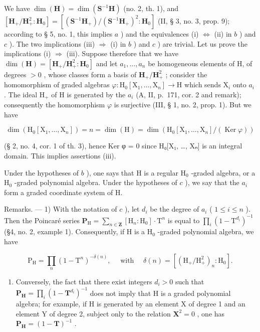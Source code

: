 We have \(\dim(\mathbf{H})=\dim(\mathbf{S}^{-1}\mathbf{H})\) (no. 2, th. 1), and \([\mathbf{H}_{+}/\mathbf{H}_{+}^{2}:\mathbf{H}_{0}]=[(\mathbf{S}^{-1}\mathbf{H}_{+})/(\mathbf{S}^{-1}\mathbf{H}_{+})^{2}:\mathbf{H}_{0}]\) (II, § 3, no. 3, prop. 9); according to § 5, no. 1, this implies \(a\) ) and the equivalences (i) \(\Leftrightarrow\) (ii) in \(b\) ) and \(c\) ). The two implications (iii) \(\Rightarrow\) (i) in \(b\) ) and \(c\) ) are trivial. Let us prove the implications (i) \(\Rightarrow\) (iii). Suppose therefore that we have \(\dim(\mathbf{H})=[\mathbf{H}_{+}/\mathbf{H}_{+}^{2}:\mathbf{H}_{0}]\) and let \(a_{1},\ldots,a_{n}\) be homogeneous elements of H, of degrees \(>0\) , whose classes form a basis of \(\mathbf{H}_{+}/\mathbf{H}_{+}^{2}\) ; consider the homomorphism of graded algebras \(\varphi:\mathrm{H}_{0}[\mathrm{X}_{1},\ldots,\mathrm{X}_{n}]\to\mathrm{H}\) which sends \(\mathrm{X}_{i}\) onto \(a_{i}\) . The ideal \(\mathrm{H}_{+}\) of H is generated by the \(a_{i}\) (A, II, p.~171, cor. 2 and remark); consequently the homomorphism \(\varphi\) is surjective (III, § 1, no. 2, prop. 1). But we have

\[
\dim \left(\mathrm{H} _ {0} \left[ \mathrm{X} _ {1}, \dots , \mathrm{X} _ {n} \right]\right) = n = \dim (\mathrm{H}) = \dim \left(\mathrm{H} _ {0} \left[ \mathrm{X} _ {1}, \dots , \mathrm{X} _ {n} \right] / (\operatorname{Ker} \varphi)\right)
\]

(§ 2, no. 4, cor. 1 of th. 3), hence Ker φ = 0 since H₀{[}X₁, \ldots, Xₙ{]} is an integral domain. This implies assertions (iii).

Under the hypotheses of \(b\) ), one says that H is a regular \(\mathrm{H}_{0}\) -graded algebra, or a \(\mathrm{H}_{0}\) -graded polynomial algebra. Under the hypotheses of \(c\) ), we say that the \(a_{i}\) form a graded coordinate system of H.

Remarks. --- 1) With the notation of \(c\) ), let \(d_{i}\) be the degree of \(a_{i}\) ( \(1 \leqslant i \leqslant n\) ). Then the Poincaré series \(\mathbf{P}_{\mathrm{H}} = \sum_{n \in \mathbf{Z}} [\mathrm{H}_{n} : \mathrm{H}_{0}] \cdot \mathrm{T}^{n}\) is equal to \(\prod_{i} (1 - \mathrm{T}^{d_{i}})^{-1}\) (§4, no. 2, example 1). Consequently, if H is a \(\mathrm{H}_{0}\) -graded polynomial algebra, we have

\[
\mathrm{P} _ {\mathrm{H}} = \prod_ {n} (1 - \mathrm{T} ^ {n}) ^ {- \delta (n)}, \quad \text { with } \quad \delta (n) = \left[ (\mathrm{H} _ {+} / \mathrm{H} _ {+} ^ {2}) _ {n}: \mathrm{H} _ {0} \right].
\]

\begin{enumerate}
\def\labelenumi{\arabic{enumi})}
\setcounter{enumi}{1}
\tightlist
\item
  Conversely, the fact that there exist integers \(d_{i}>0\) such that \(\mathbf{P}_{\mathbf{H}}=\prod_{i}(1-\mathbf{T}^{d_{i}})^{-1}\) does not imply that H is a graded polynomial algebra; for example, if H is generated by an element X of degree 1 and an element Y of degree 2, subject only to the relation \(\mathbf{X}^{2}=0\) , one has \(\mathbf{P}_{\mathbf{H}}=(1-\mathbf{T})^{-1}\) .
\end{enumerate}

